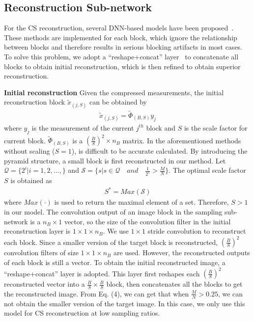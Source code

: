 \documentclass{article}
\begin{document}
\subsection{Reconstruction Sub-network}
For the CS reconstruction, several DNN-based models have been proposed~\cite{kulkarni2016reconnet,adler2016deep}. These methods are implemented for each block, which ignore the relationship between blocks and therefore results in serious blocking artifacts in most cases. To solve this problem, we adopt a ``reshape+concat'' layer~\cite{shi2017deep} to concatenate all blocks to obtain initial reconstruction, which is then refined to obtain superior reconstruction.

\textbf{Initial reconstruction}
Given the compressed measurements, the initial reconstruction block $\tilde{x}_{(j,S)}$ can be obtained by
\begin{eqnarray}
\label{equ2}
\tilde{x}_{(j,S)} = \tilde{\Phi}_{(B,S)}y_{j}
\end{eqnarray}
where $y_{j}$ is the measurement of the current $j^{th}$ block and $S$ is the scale factor for current block. $\tilde{\Phi}_{(B,S)}$ is a $(\frac{B}{S})^{2}\times n_{B}$ matrix. In the  aforementioned
methods without scaling ($S=1$), is difficult to be accurate calculated. By introducing the pyramid structure, a small block is first reconstructed in our method. Let $\mathcal{Q} = \{2^i | i=1, 2, \ldots, \}$ and $\mathcal{S} = \{s| s\in \mathcal{Q} \quad and \quad \frac{1}{2^s} > \frac{M}{N}\}$. The optimal scale factor $S$ is obtained as
\begin{eqnarray}
\label{qeu4}
  S^{\ast} = Max(\mathcal{S})
\end{eqnarray}
where $Max (\cdot)$ is used to return the maximal element of a set. Therefore, $S>1$  in our model. The convolution output of an image block in the sampling sub-network is a $n_{B}\times 1$ vector, so the size of the convolution filter in the initial reconstruction layer is $1\times 1\times n_{B}$. We use $1\times 1$ stride convolution to reconstruct each block. Since a smaller version of the target block is reconstructed, $(\frac{B}{S})^{2}$ convolution filters of size $1\times 1\times n_{B}$ are used. However, the reconstructed outputs of each block is still a vector. To obtain the initial reconstructed image, a ``reshape+concat'' layer is adopted. This layer first reshapes each $(\frac{B}{S})^{2}$ reconstructed vector into a $\frac{B}{S} \times \frac{B}{S}$ block, then concatenates all the blocks to get the reconstructed image. From Eq. (4), we can get that when $\frac{M}{N}>0.25$, we can not obtain the smaller version of the target image. In this case, we only use this model for CS reconstruction at low sampling ratios.
\end{document}
